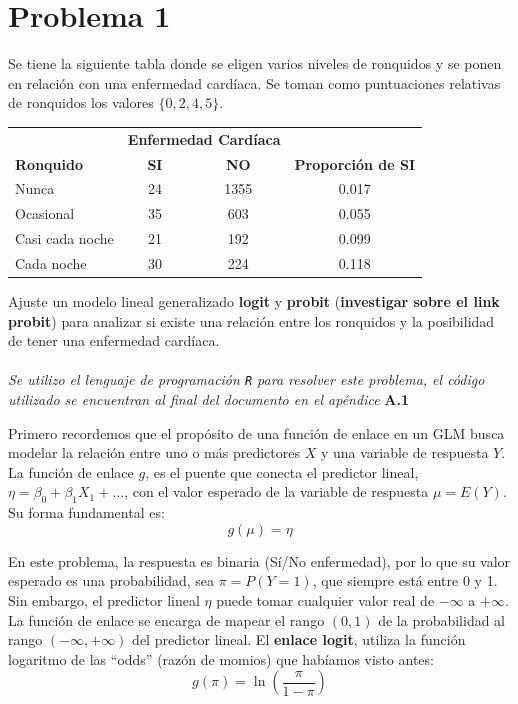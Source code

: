 

\section*{Problema \textcolor{CIMATRed}{1}}

Se tiene la siguiente tabla donde se eligen varios niveles de ronquidos y se ponen en relación con una enfermedad cardíaca. Se toman como puntuaciones relativas de ronquidos los valores $\{0, 2, 4, 5\}$.

\begin{center}
\begin{tabular}{lccc}
\toprule
& \multicolumn{2}{c}{\textbf{Enfermedad Cardíaca}} & \\
\cmidrule(lr){2-3}
\textbf{Ronquido} & \textbf{SI} & \textbf{NO} & \textbf{Proporción de SI} \\
\midrule
Nunca & 24 & 1355 & 0.017 \\
Ocasional & 35 & 603 & 0.055 \\
Casi cada noche & 21 & 192 & 0.099 \\
Cada noche & 30 & 224 & 0.118 \\
\bottomrule
\end{tabular}
\end{center}

Ajuste un modelo lineal generalizado \textbf{logit} y \textbf{probit} (\textbf{investigar sobre el link probit}) para analizar si existe una relación entre los ronquidos y la posibilidad de tener una enfermedad cardíaca.\\

\noindent{}\\

\textit{Se utilizo el lenguaje de programación \texttt{R} para resolver este problema, el código utilizado se encuentran al final del documento en el apéndice} \textbf{A.1}

Primero recordemos que el propósito de una función de enlace en un GLM busca modelar la relación entre uno o más predictores $X$ y una variable de respuesta $Y$. La función de enlace $g$, es el puente que conecta el predictor lineal, $\eta = \beta_0 + \beta_1X_1 + \dots$, con el valor esperado de la variable de respuesta $\mu = E(Y)$. Su forma fundamental es: 
\begin{equation}
    g(\mu) = \eta    
\end{equation}

En este problema, la respuesta es binaria (Sí/No enfermedad), por lo que su valor esperado es una probabilidad, sea $\pi = P(Y=1)$, que siempre está entre 0 y 1. Sin embargo, el predictor lineal $\eta$ puede tomar cualquier valor real de $-\infty$ a $+\infty$. La función de enlace se encarga de mapear el rango $(0, 1)$ de la probabilidad al rango $(-\infty, +\infty)$ del predictor lineal. El \textbf{enlace logit}, utiliza la función logaritmo de las ``odds'' (razón de momios) que habíamos visto antes: 
\begin{equation}
    g(\pi) = \ln\left(\frac{\pi}{1-\pi}\right)
\end{equation}
   
